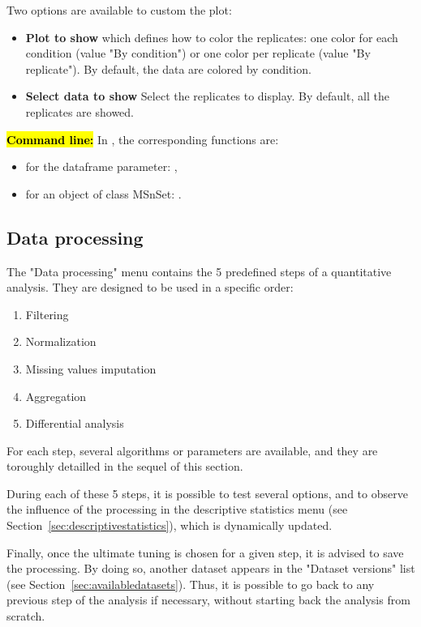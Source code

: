 \documentclass[12pt]{article}
\begin{document}
{{Two options are available to custom the plot:
\begin{itemize}
\item \textbf{Plot to show} which defines how to color the replicates: one 
color for each condition (value "By condition") or one color per replicate 
(value "By replicate"). By default, the data are colored by condition.
\item \textbf{Select data to show} Select the replicates to display. By 
default, all the replicates are showed.
\end {itemize}
}


\hl{\bf Command line:} In , the corresponding functions are:
\begin{itemize}
\item for the dataframe parameter: ,
\item for an object of class MSnSet: .
\end{itemize}


\subsection{Data processing}\label{sec:processingadataset}

The "Data processing" menu contains the 5 predefined steps of a quantitative 
analysis. They are designed to be used in a specific order:
\begin{enumerate}
\item {Filtering}
\item{Normalization}
\item{Missing values imputation}
\item{Aggregation}
\item{Differential analysis}
\end{enumerate}
For each step, several algorithms or parameters are available, and they are 
toroughly detailled in the sequel of this section.

During each of these 5 steps, it is possible to test several options, and to 
observe the influence of the processing in the descriptive statistics menu 
(see Section~\ref{sec:descriptivestatistics}), which is dynamically updated. 

Finally, once the ultimate tuning is chosen for a given step, it is advised 
to save the processing. By doing so, another dataset appears in the "Dataset 
versions" list (see Section~\ref{sec:availabledatasets}). Thus, it is possible 
to go back to any previous step of the analysis if necessary, without starting 
back the analysis from scratch.

}
\end{document}
